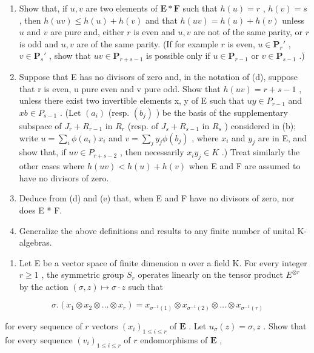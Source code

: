 \begin{enumerate}
\def\labelenumi{(\alph{enumi})}
\setcounter{enumi}{3}
\item
  Show that, if \(u, v\) are two elements of \(\mathbf{E} * \mathbf{F}\) such that \(h(u) = r\) , \(h(v) = s\) , then \(h(uv) \leqslant h(u) + h(v)\) and that \(h(uv) = h(u) + h(v)\) unless \(u\) and \(v\) are pure and, either \(r\) is even and \(u, v\) are not of the same parity, or \(r\) is odd and \(u, v\) are of the same parity. (If for example \(r\) is even, \(u \in \mathbf{P}_r'\) , \(v \in \mathbf{P}_s'\) , show that \(uv \in \mathbf{P}_{r+s-1}\) is possible only if \(u \in \mathbf{P}_{r-1}\) or \(v \in \mathbf{P}_{s-1}\) .)
\item
  Suppose that E has no divisors of zero and, in the notation of (d), suppose that r is even, u pure even and v pure odd. Show that \(h(uv) = r + s - 1\) , unless there exist two invertible elements x, y of E such that \(uy \in P_{r-1}\) and \(xb \in P_{s-1}\) . (Let \((a_i)\) (resp. \((b_j)\) ) be the basis of the supplementary subspace of \(J_r + R_{r-1}\) in \(R_r\) (resp. of \(J_s + R_{s-1}\) in \(R_s\) ) considered in (b); write \(u = \sum_i \phi(a_i)x_i\) and \(v = \sum_j y_j \phi(b_j)\) , where \(x_i\) and \(y_j\) are in E, and show that, if \(uv \in P_{r+s-2}\) , then necessarily \(x_i y_j \in K\) .) Treat similarly the other cases where \(h(uv) < h(u) + h(v)\) when E and F are assumed to have no divisors of zero.
\item
  Deduce from (d) and (e) that, when E and F have no divisors of zero, nor does E * F.
\item
  Generalize the above definitions and results to any finite number of unital K-algebras.
\end{enumerate}

\begin{enumerate}
\def\labelenumi{\arabic{enumi}.}
\setcounter{enumi}{6}
\tightlist
\item
  Let E be a vector space of finite dimension n over a field K. For every integer \(r \geqslant 1\) , the symmetric group \(S_{r}\) operates linearly on the tensor product \(E^{\otimes r}\) by the action \((\sigma, z) \mapsto \sigma \cdot z\) such that
\end{enumerate}

\[
\sigma . \left(x _ {1} \otimes x _ {2} \otimes \dots \otimes x _ {r}\right) = x _ {\sigma^ {- 1} (1)} \otimes x _ {\sigma^ {- 1} (2)} \otimes \dots \otimes x _ {\sigma^ {- 1} (r)}
\]

for every sequence of \(r\) vectors \((x_i)_{1 \leqslant i \leqslant r}\) of \(\mathbf{E}\) . Let \(u_{\sigma}(z) = \sigma, z\) . Show that for every sequence \((v_i)_{1 \leqslant i \leqslant r}\) of \(r\) endomorphisms of \(\mathbf{E}\) ,

